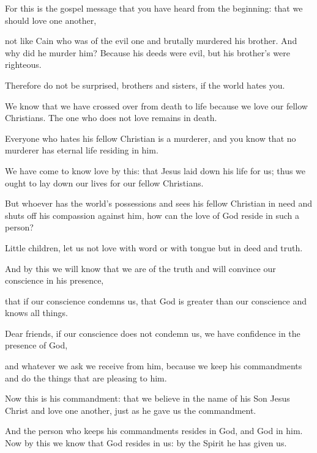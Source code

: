 \begin{scripture}
 For this is the gospel message that you have heard from the beginning: that we should love one another,
 not like Cain who was of the evil one and brutally murdered his brother. And why did he murder him? Because his deeds were evil, but his brother's were righteous.
\everypar{}

 Therefore do not be surprised, brothers and sisters, if the world hates you.
 We know that we have crossed over from death to life because we love our fellow Christians. The one who does not love remains in death.
 Everyone who hates his fellow Christian is a murderer, and you know that no murderer has eternal life residing in him.
 We have come to know love by this: that Jesus laid down his life for us; thus we ought to lay down our lives for our fellow Christians.
 But whoever has the world's possessions and sees his fellow Christian in need and shuts off his compassion against him, how can the love of God reside in such a person?
\everypar{}

 Little children, let us not love with word or with tongue but in deed and truth.
 And by this we will know that we are of the truth and will convince our conscience in his presence,
 that if our conscience condemns us, that God is greater than our conscience and knows all things.
 Dear friends, if our conscience does not condemn us, we have confidence in the presence of God,
 and whatever we ask we receive from him, because we keep his commandments and do the things that are pleasing to him.
 Now this is his commandment: that we believe in the name of his Son Jesus Christ and love one another, just as he gave us the commandment.
 And the person who keeps his commandments resides in God, and God in him. Now by this we know that God resides in us: by the Spirit he has given us.


\end{scripture}
